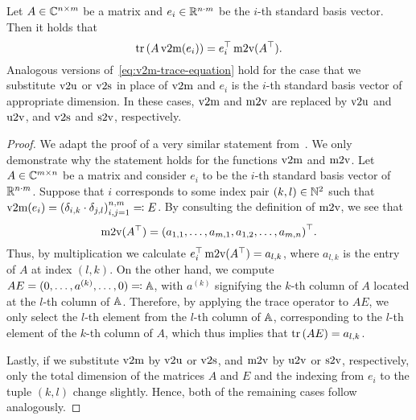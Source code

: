 \begin{lemma}\label{lem:v2m-function-trace}
    Let $A \in \mathbb{C}^{n \times m}$ be a matrix and $e_i \in \mathbb{R}^{n \cdot m}$ be the $i$-th standard basis vector.
    Then it holds that
    \begin{equation}\label{eq:v2m-trace-equation}
        \mathop{}\!\mathrm{tr}\left(A \mathop{}\!\mathrm{v}2\mathrm{m}(e_i)\right) = e_i^{\top} \mathop{}\!\mathrm{m}2\mathrm{v}(A^{\top}).
    \end{equation}
    Analogous versions of~\eqref{eq:v2m-trace-equation} hold for the case that we substitute $\mathop{}\!\mathrm{v}2\mathrm{u}$ or $\mathop{}\!\mathrm{v}2\mathrm{s}$ in place of $\mathop{}\!\mathrm{v}2\mathrm{m}$ and $e_i$ is the $i$-th standard basis vector of appropriate dimension.
    In these cases, $\mathop{}\!\mathrm{v}2\mathrm{m}$ and $\mathop{}\!\mathrm{m}2\mathrm{v}$ are replaced by $\mathop{}\!\mathrm{v}2\mathrm{u}$ and $\mathop{}\!\mathrm{u}2\mathrm{v}$, and $\mathop{}\!\mathrm{v}2\mathrm{s}$ and $\mathop{}\!\mathrm{s}2\mathrm{v}$, respectively.
\end{lemma}

\begin{proof}
    We adapt the proof of a very similar statement from~\cite[Lemma~3.4]{SV2023}.
    We only demonstrate why the statement holds for the functions $\mathop{}\!\mathrm{v}2\mathrm{m}$ and $\mathop{}\!\mathrm{m}2\mathrm{v}$.
    Let $A \in \mathbb{C}^{m \times n}$ be a matrix and consider $e_i$ to be the $i$-th standard basis vector of $\mathbb{R}^{n \cdot m}$.
    Suppose that $i$ corresponds to some index pair $(k, l) \in \mathbb{N}^2$ such that $\mathop{}\!\mathrm{v}2\mathrm{m}(e_i) = {(\delta_{i, k} \cdot \delta_{j, l})}_{i, j = 1}^{n, m} \eqqcolon E$.
    By consulting the definition of $\mathop{}\!\mathrm{m}2\mathrm{v}$, we see that
    \begin{equation*}
        \mathop{}\!\mathrm{m}2\mathrm{v}(A^{\top}) = {(a_{1, 1}, \dots, a_{m, 1}, a_{1, 2}, \dots, a_{m, n})}^{\top}.
    \end{equation*}
    Thus, by multiplication we calculate $e_i^{\top} \mathop{}\!\mathrm{m}2\mathrm{v}(A^{\top}) = a_{l, k}$, where $a_{l, k}$ is the entry of $A$ at index $(l, k)$.
    On the other hand, we compute $A E = (0, \dots, a^{(k)}, \dots, 0) \eqqcolon \mathbb{A}$, with $a^{(k)}$ signifying the $k$-th column of $A$ located at the $l$-th column of $\mathbb{A}$.
    Therefore, by applying the trace operator to $A E$, we only select the $l$-th element from the $l$-th column of $\mathbb{A}$, corresponding to the $l$-th element of the $k$-th column of $A$, which thus implies that $\mathop{}\!\mathrm{tr}\left(A E\right) = a_{l, k}$.

    Lastly, if we substitute $\mathop{}\!\mathrm{v}2\mathrm{m}$ by $\mathop{}\!\mathrm{v}2\mathrm{u}$ or $\mathop{}\!\mathrm{v}2\mathrm{s}$, and $\mathop{}\!\mathrm{m}2\mathrm{v}$ by $\mathop{}\!\mathrm{u}2\mathrm{v}$ or $\mathop{}\!\mathrm{s}2\mathrm{v}$, respectively, only the total dimension of the matrices $A$ and $E$ and the indexing from $e_i$ to the tuple $(k, l)$ change slightly.
    Hence, both of the remaining cases follow analogously.
\end{proof}

